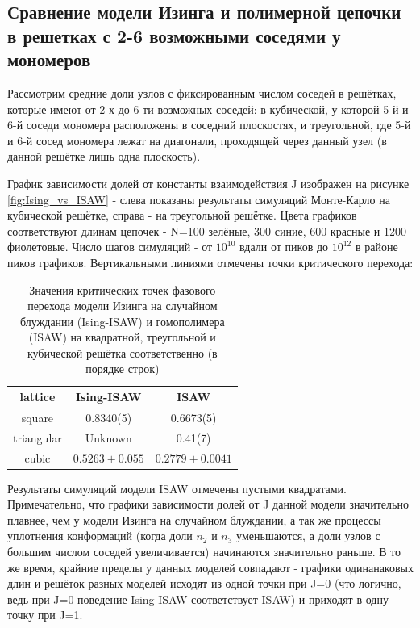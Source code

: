 \subsection{Сравнение модели Изинга и полимерной цепочки в решетках с 2-6 возможными соседями у мономеров}

Рассмотрим средние доли узлов с фиксированным числом соседей в решётках, которые имеют от 2-х до 6-ти возможных соседей: в кубической, у которой 5-й и 6-й соседи мономера расположены в соседний плоскостях, и треугольной, где 5-й и 6-й сосед мономера лежат на диагонали, проходящей через данный узел (в данной решётке лишь одна плоскость).

График зависимости долей от константы взаимодействия J изображен на рисунке \ref{fig:Ising_vs_ISAW} - слева показаны результаты симуляций Монте-Карло на кубической решётке, справа - на треугольной решётке. Цвета графиков соответствуют длинам цепочек - N=100 зелёные, 300 синие, 600 красные и 1200 фиолетовые. Число шагов симуляций - от $10^{10}$ вдали от пиков до $10^{12}$ в районе пиков графиков. Вертикальными линиями отмечены точки критического перехода: 

\begin{table}[h!]
    \centering
    \begin{tabular}{|c|c|c|}
        \hline
        lattice & Ising-ISAW & ISAW \\ \hline
        square & 0.8340(5)\cite{faizullina2021critical} &  0.6673(5)\cite{caracciolo2011geometrical} \\ \hline
        triangular & Unknown & 0.41(7) \cite{Privman1986}\\ \hline
        cubic & $0.5263 \pm 0.055$\cite{foster2021critical} & $0.2779 \pm 0.0041$\cite{Tesi1996} \\ \hline
    \end{tabular}
    \caption{Значения критических точек фазового перехода модели Изинга на случайном блуждании (Ising-ISAW) и гомополимера (ISAW) на квадратной, треугольной и кубической решётка соответственно (в порядке строк)}
    \label{tab:crits}
\end{table}

Результаты симуляций модели ISAW отмечены пустыми квадратами. Примечательно, что графики зависимости долей от J данной модели значительно плавнее, чем у модели Изинга на случайном блуждании, а так же процессы уплотнения конформаций (когда доли $n_{2}$ и $n_{3}$ уменьшаются, а доли узлов с большим числом соседей увеличивается) начинаются значительно раньше. В то же время, крайние пределы у данных моделей совпадают - графики одинанаковых длин и решёток разных моделей исходят из одной точки при J=0 (что логично, ведь при J=0 поведение Ising-ISAW соответствует ISAW) и приходят в одну точку при J=1.

